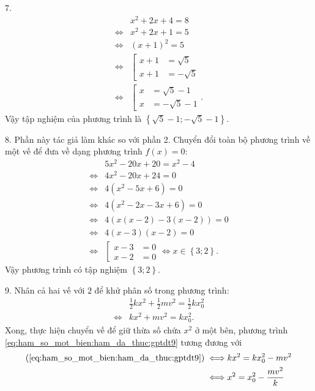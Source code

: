 7. 
\begin{align*}
   &x^2 + 2x + 4 = 8 \\ 
   \iff &x^2 + 2x + 1 = 5 \\
   \iff &(x + 1)^2 = 5 \\
   \iff &\left[
      \begin{aligned}
         x + 1 &= \sqrt{5} \\
         x + 1 &= -\sqrt{5}
      \end{aligned}
   \right. \\
   \iff &\left[
      \begin{aligned}
         x &= \sqrt{5} - 1 \\
         x &= -\sqrt{5} - 1
      \end{aligned}
   \right..
\end{align*}
Vậy tập nghiệm của phương trình là $\boxed{\displaystyle\left\{\sqrt{5} - 1; -\sqrt{5} - 1\right\}}$.

8. Phần này tác giả làm khác so với phần 2. Chuyển đổi toàn bộ phương trình về một vế để đưa về dạng phương trình $f(x) = 0$:
\begin{align*}
   &5x^2 - 20x + 20 = x^2 - 4 \\
   \iff &4x^2 - 20x + 24 = 0 \\
   \iff &4\left(x^2 - 5x + 6\right) = 0 \\
   \iff &4\left(x^2 - 2x - 3x + 6\right) = 0 \\
   \iff &4\left(x(x - 2) - 3(x - 2)\right) = 0 \\
   \iff &4(x - 3)(x - 2) = 0 \\
   \iff &\left[
      \begin{aligned}
         x - 3 &= 0 \\
         x - 2 &= 0
      \end{aligned}
   \right. \iff x \in \left\{3; 2\right\}. 
\end{align*}
Vậy phương trình có tập nghiệm $\boxed{\left\{3; 2\right\}}$.

9. Nhân cả hai vế với $2$ để khử phân số trong phương trình:
\begin{align}
   &\frac{1}{2}kx^2 + \frac{1}{2}mv^2 = \frac{1}{2}kx_0^2 \nonumber \\
   \iff &kx^2 + mv^2 = kx_0^2. \label{eq:ham_so_mot_bien:ham_da_thuc:gptdt9}
\end{align}
Xong, thực hiện chuyển vế để giữ thừa số chứa $x^2$ ở một bên, phương trình \ref{eq:ham_so_mot_bien:ham_da_thuc:gptdt9} tương đương với
\begin{align*}
   (\ref{eq:ham_so_mot_bien:ham_da_thuc:gptdt9}) \iff &kx^2 = kx_0^2 - mv^2 \\
   \iff & x^2 = x_0^2 - \frac{mv^2}{k}
\end{align*}

